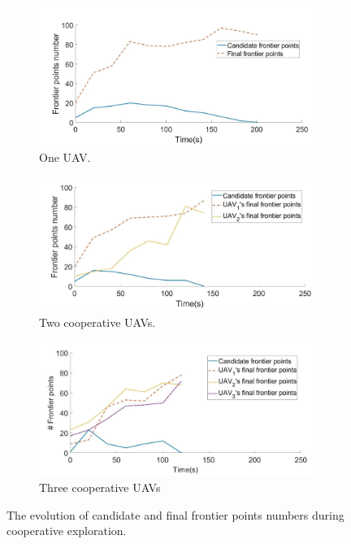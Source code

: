 \documentclass[11pt,openany]{book}
\begin{document}
\begin{figure}[H]
    \centering
    \begin{subfigure}[H]{0.7\linewidth}
        \includegraphics[width=\linewidth]{assets/3_15_a.png}
        \caption{{One UAV.}}
        \label{fig:3.15a}
    \end{subfigure}
    \begin{subfigure}[H]{0.7\linewidth}
        \includegraphics[width=\linewidth]{assets/3_15_b.png}
        \caption{{Two cooperative UAVs.}}
        \label{fig:3.15b}
    \end{subfigure}
    \begin{subfigure}[H]{0.7\linewidth}
        \includegraphics[width=\linewidth]{assets/3_15_c.png}
        \caption{{Three cooperative UAVs}}
        \label{fig:3.15c}
    \end{subfigure}
    \caption{The evolution of candidate and final frontier points numbers during cooperative exploration.}
    \label{fig:3.15}
\end{figure}
\end{document}
